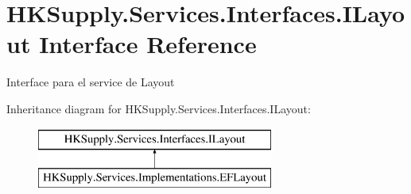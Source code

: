 \hypertarget{interface_h_k_supply_1_1_services_1_1_interfaces_1_1_i_layout}{}\section{H\+K\+Supply.\+Services.\+Interfaces.\+I\+Layout Interface Reference}
\label{interface_h_k_supply_1_1_services_1_1_interfaces_1_1_i_layout}


Interface para el service de Layout  


Inheritance diagram for H\+K\+Supply.\+Services.\+Interfaces.\+I\+Layout\+:\begin{figure}[H]
\begin{center}
\leavevmode
\includegraphics[height=2.000000cm]{interface_h_k_supply_1_1_services_1_1_interfaces_1_1_i_layout}
\end{center}
\end{figure}
